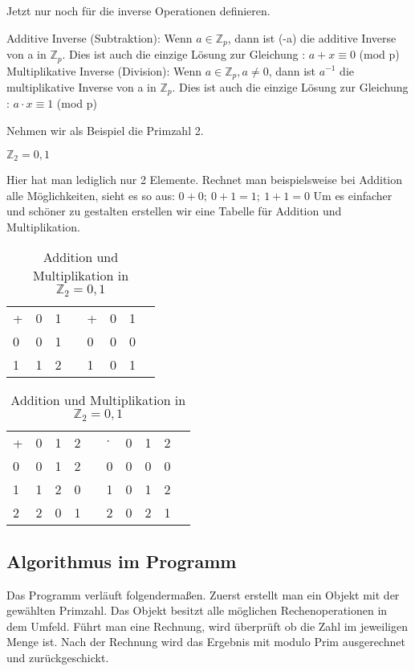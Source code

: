 Jetzt nur noch für die inverse Operationen definieren.

Additive Inverse (Subtraktion): Wenn $a \in \mathbb{Z}_p$, dann ist (-a) die additive Inverse von a in $\mathbb{Z}_p$. Dies ist auch die einzige Lösung zur Gleichung : $a + x \equiv 0$ (mod p)
Multiplikative Inverse (Division): Wenn $a \in \mathbb{Z}_p, a \neq 0 $,  dann ist $a^{-1}$ die multiplikative Inverse von a in $\mathbb{Z}_p$. Dies ist auch die einzige Lösung zur Gleichung : $a \cdot x \equiv 1$ (mod p)

Nehmen wir als Beispiel die Primzahl 2.

$ \mathbb{Z}_2 = {0,1} $

Hier hat man lediglich nur 2 Elemente. Rechnet man beispielsweise bei Addition alle Möglichkeiten, sieht es so aus: $0 + 0;\ 0 + 1 = 1;\ 1 + 1 = 0$ 
Um es einfacher und schöner zu gestalten erstellen wir eine Tabelle für Addition und Multiplikation.


\begin{table}[h]\caption{Addition und Multiplikation in $ \mathbb{Z}_2 = {0,1} $}
    \begin{tabular}{l|l|lll|l|ll}
    + & 0 & 1 &  & + & 0 & 1 &  \\ \cline{1-3} \cline{5-7}
    0 & 0 & 1 &  & 0 & 0 & 0 &  \\ \cline{1-3} \cline{5-7}
    1 & 1 & 2 &  & 1 & 0 & 1 & 
    \end{tabular}
\end{table}

\begin{table}[h]\caption{Addition und Multiplikation in $ \mathbb{Z}_2 = {0,1} $}
    \begin{tabular}{l|l|l|lll|l|l|ll}
    + & 0 & 1 & 2 &  & $\cdot$ & 0 & 1 & 2 &  \\ \cline{1-4} \cline{6-9}
    0 & 0 & 1 & 2 &  & 0 & 0 & 0 & 0 &  \\ \cline{1-4} \cline{6-9}
    1 & 1 & 2 & 0 &  & 1 & 0 & 1 & 2 &  \\ \cline{1-4} \cline{6-9}
    2 & 2 & 0 & 1 &  & 2 & 0 & 2 & 1 & 
    \end{tabular}
\end{table}

\subsection*{Algorithmus im Programm}

Das Programm verläuft folgendermaßen. Zuerst erstellt man ein Objekt mit der gewählten Primzahl. Das Objekt besitzt alle möglichen Rechenoperationen in dem Umfeld.
Führt man eine Rechnung, wird überprüft ob die Zahl im jeweiligen Menge ist. Nach der Rechnung wird das Ergebnis mit modulo Prim ausgerechnet und zurückgeschickt. 

